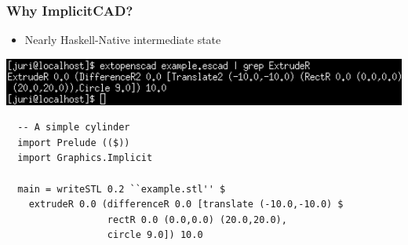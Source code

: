 \documentclass{beamer}
\begin{document}
\begin{frame}[fragile]
  \frametitle{Why ImplicitCAD?}
\begin{itemize}
\item Nearly Haskell-Native intermediate state
\end{itemize}
\includegraphics[width=1.0\textwidth, center]{extopenscad-haskell_intermediate.png}
\lstset{basicstyle=\ttfamily\scriptsize}
\begin{lstlisting}
  -- A simple cylinder
  import Prelude (($))
  import Graphics.Implicit

  main = writeSTL 0.2 ``example.stl'' $
    extrudeR 0.0 (differenceR 0.0 [translate (-10.0,-10.0) $
                  rectR 0.0 (0.0,0.0) (20.0,20.0),
                  circle 9.0]) 10.0
\end{lstlisting}
\end{frame}
\end{document}
